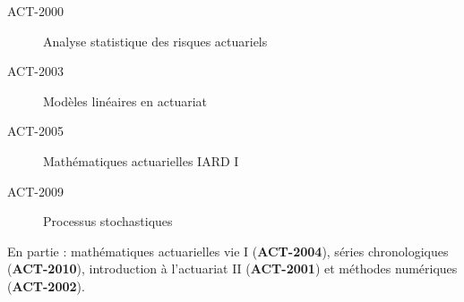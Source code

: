 \begin{distributions}
\begin{description}
	\item[ACT-2000]	Analyse statistique des risques actuariels
	\item[ACT-2003]	Modèles linéaires en actuariat
	\item[ACT-2005]	Mathématiques actuarielles IARD I
	\item[ACT-2009]	Processus stochastiques
\end{description}

En partie : mathématiques actuarielles vie I (\textbf{ACT-2004}), séries chronologiques (\textbf{ACT-2010}), introduction à l'actuariat II (\textbf{ACT-2001}) et méthodes numériques (\textbf{ACT-2002}).
\end{distributions}
